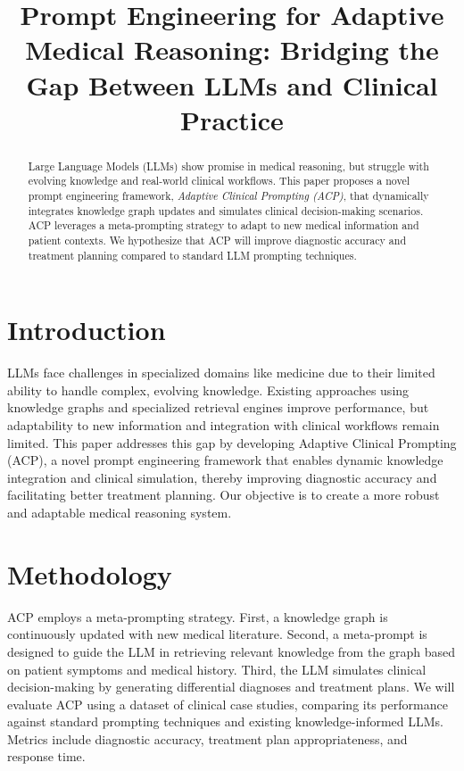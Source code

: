 \documentclass{article}
\title{Prompt Engineering for Adaptive Medical Reasoning: Bridging the Gap Between LLMs and Clinical Practice}
\author{}
\date{}
\begin{document}
\maketitle

\begin{abstract}
Large Language Models (LLMs) show promise in medical reasoning, but struggle with evolving knowledge and real-world clinical workflows. This paper proposes a novel prompt engineering framework, \textit{Adaptive Clinical Prompting (ACP)}, that dynamically integrates knowledge graph updates and simulates clinical decision-making scenarios. ACP leverages a meta-prompting strategy to adapt to new medical information and patient contexts. We hypothesize that ACP will improve diagnostic accuracy and treatment planning compared to standard LLM prompting techniques.
\end{abstract}

\section{Introduction}
LLMs face challenges in specialized domains like medicine due to their limited ability to handle complex, evolving knowledge. Existing approaches using knowledge graphs and specialized retrieval engines improve performance, but adaptability to new information and integration with clinical workflows remain limited. This paper addresses this gap by developing Adaptive Clinical Prompting (ACP), a novel prompt engineering framework that enables dynamic knowledge integration and clinical simulation, thereby improving diagnostic accuracy and facilitating better treatment planning. Our objective is to create a more robust and adaptable medical reasoning system.

\section{Methodology}
ACP employs a meta-prompting strategy. First, a knowledge graph is continuously updated with new medical literature. Second, a meta-prompt is designed to guide the LLM in retrieving relevant knowledge from the graph based on patient symptoms and medical history. Third, the LLM simulates clinical decision-making by generating differential diagnoses and treatment plans. We will evaluate ACP using a dataset of clinical case studies, comparing its performance against standard prompting techniques and existing knowledge-informed LLMs. Metrics include diagnostic accuracy, treatment plan appropriateness, and response time.
\end{document}
